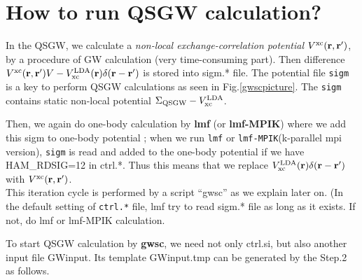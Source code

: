 \documentclass[a4paper,10pt,epsf,fleqn]{article}
\newcommand{\bfr}{{\bf r}}
\newcommand{\exe}[1]{{\bf #1}}
\newcommand{\io}[1]{{\sf  #1}}
\begin{document}
\section{How to run  QSGW calculation?}

In the QSGW, we calculate a 
{\it non-local exchange-correlation potential} $V^{\rm xc}(\bfr,\bfr')$,
by a procedure of GW calculation (very time-consuming part).
Then difference $V^{\rm xc}(\bfr,\bfr')V-V_{\rm xc}^{\rm
LDA}(\bfr)\delta(\bfr-\bfr')$  is stored into \io{sigm.*} file. 
The potential file \verb#sigm# is a key to perform QSGW calculations as seen in
Fig.\ref{gwscpicture}. The \verb#sigm# contains static non-local potential 
$\Sigma_{\rm QSGW}-V_{\rm xc}^{\rm LDA}$. 

Then, we again do one-body calculation by \exe{lmf} (or \exe{lmf-MPIK})
where we add this sigm to one-body potential ;
when we run \verb#lmf# or \verb#lmf-MPIK#(k-parallel mpi version),
\verb#sigm# is read and added to the one-body potential 
if we have \io{HAM\_RDSIG=12} in \io{ctrl.*}.
Thus this means that
we replace $V_{\rm xc}^{\rm LDA}(\bfr)\delta(\bfr-\bfr')$ 
with $V^{\rm xc}(\bfr,\bfr')$.\\

This iteration cycle is performed by a script ``gwsc'' as we
explain later on. (In the default setting of \verb+ctrl.*+ file, lmf try
to read sigm.* file as long as it exists. If not, do lmf or lmf-MPIK calculation.

To start QSGW calculation by \exe{gwsc},
we need not only \io{ctrl.si}, but also another input file \io{GWinput}.
Its template \io{GWinput.tmp} can be generated by the Step.2 as follows.
\end{document}
